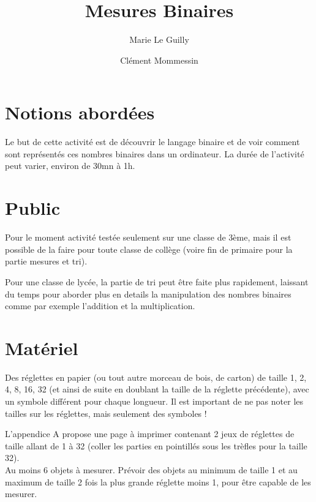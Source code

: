 \documentclass[a4paper,12pt]{scrartcl}
\begin{document}
\title{Mesures Binaires}
\author{Marie Le Guilly \and Clément Mommessin}

\maketitle

\section{Notions abordées}

Le but de cette activité est de découvrir le langage binaire et de voir comment sont représentés ces nombres binaires dans un ordinateur.
La durée de l'activité peut varier, environ de 30mn à 1h.


\section{Public}

Pour le moment activité testée seulement sur une classe de 3ème, mais il est possible de la faire pour toute classe de collège (voire fin de primaire pour la partie mesures et tri).

Pour une classe de lycée, la partie de tri peut être faite plus rapidement, laissant du temps pour aborder plus en details la manipulation des nombres binaires comme par exemple l'addition et la multiplication.



\section{Matériel}

Des réglettes en papier (ou tout autre morceau de bois, de carton) de taille 1, 2, 4, 8, 16, 32 (et ainsi de suite en doublant la taille de la réglette précédente), avec un symbole différent pour chaque longueur. Il est important de ne pas noter les tailles sur les réglettes, mais seulement des symboles !

L'appendice A propose une page à imprimer contenant 2 jeux de réglettes de taille allant de 1 à 32 (coller les parties en pointillés sous les trèfles pour la taille 32).\\


Au moins 6 objets à mesurer. Prévoir des objets au minimum de taille 1 et au maximum de taille 2 fois la plus grande réglette moins 1, pour être capable de les mesurer.
\end{document}
